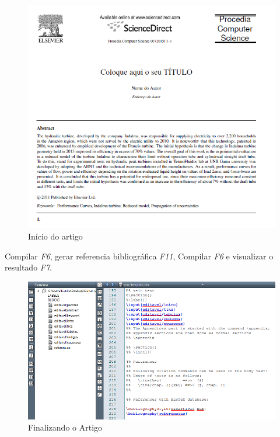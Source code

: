 \begin{frame}[fragile]
\begin{figure}
\begin{center}
\includegraphics[scale=.4]{figuras/fig4}
\caption{Início do artigo}
\end{center}
\end{figure}
\end{frame}



\begin{frame}[fragile]
Compilar \textit{F6}, gerar referencia bibliográfica \textit{F11},  Compilar \textit{F6} e visualizar o resultado \textit{F7}.
\begin{figure}
\begin{center}
\includegraphics[scale=.5]{figuras/fig5}
\caption{Finalizando o Artigo}
\end{center}
\end{figure}
\end{frame}



